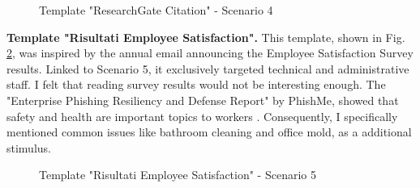 \documentclass[a4paper]{article}
\begin{document}
\begin{figure}[H]
	\centering
	\caption{Template "ResearchGate Citation" - Scenario 4}
	\label{template-s4b3}
\end{figure}

\newpage

\noindent
\textbf{Template "Risultati Employee Satisfaction".} This template, shown in Fig. \ref{template-s5b3}, was inspired by the annual email announcing the Employee Satisfaction Survey results. Linked to Scenario 5, it exclusively targeted technical and administrative staff. I felt that reading survey results would not be interesting enough. The "Enterprise Phishing Resiliency and Defense Report" by PhishMe, showed that safety and health are important topics to workers \cite{report-phishme}. Consequently, I specifically mentioned common issues like bathroom cleaning and office mold, as a additional stimulus.

\bigskip

\begin{figure}[H]
	\centering
	\caption{Template "Risultati Employee Satisfaction" - Scenario 5}
	\label{template-s5b3}
\end{figure}
\end{document}
